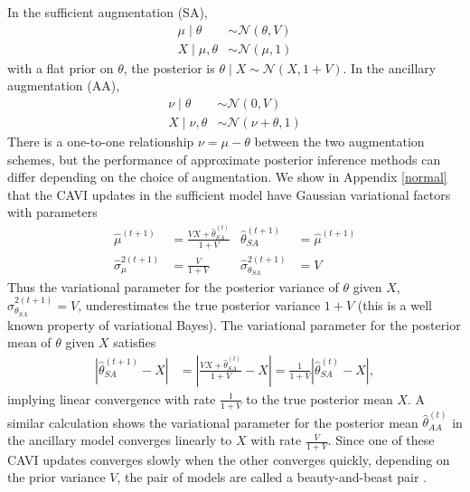 \documentclass{article}
\begin{document}
In the sufficient augmentation (SA),
\begin{align}
\mu \mid \theta
&\sim \mathcal N(\theta,V) \\
X\mid \mu,\theta
&\sim \mathcal N(\mu,1)
\end{align}
with a flat prior on $\theta$, the posterior is $\theta\mid X\sim\mathcal N(X,1+V)$. In the ancillary augmentation (AA),
\begin{align}
\nu \mid \theta
&\sim \mathcal N(0,V) \\
X\mid \nu,\theta
&\sim \mathcal N(\nu +\theta,1)
\end{align}
There is a one-to-one relationship $\nu=\mu-\theta$ between the two augmentation schemes, but the performance of approximate posterior inference methods can differ depending on the choice of augmentation. We show in Appendix \ref{normal} that the CAVI updates in the sufficient model have Gaussian variational factors with parameters 
\begin{align*}
\widehat\mu^{(t+1)}
&= \frac{VX + \widehat\theta^{(t)}_{SA}}{1+V} 
&
\widehat\theta^{(t+1)}_{SA}
&= \widehat\mu^{(t+1)} \\
\widehat\sigma^{2(t+1)}_{\mu}
&= \frac{V}{1+V} 
&
\widehat\sigma^{2(t+1)}_{\theta_{SA}}
&= V
\end{align*}
Thus the variational parameter for the posterior variance of $\theta$ given $X$, $\widehat\sigma^{2(t+1)}_{\theta_{SA}}= V$,  underestimates the true posterior variance $1+V$ (this is a well known property of variational Bayes). The variational parameter for the posterior mean of $\theta$ given $X$ satisfies
\begin{align*}
\left|\widehat\theta^{(t+1)}_{SA} - X\right|
&= \left|\frac{VX + \widehat\theta^{(t)}_{SA}}{1+V} - X\right| 
= \frac{1}{1+V} \left|\widehat\theta^{(t)}_{SA}-X\right|,
\end{align*}
implying linear convergence with rate $\frac{1}{1+V}$ to the true posterior mean $X$. A similar calculation shows the variational parameter for the posterior mean $\widehat\theta^{(t)}_{AA}$ in the ancillary model converges linearly to $X$ with rate $\frac{V}{1+V}$. Since one of these CAVI updates converges slowly when the other converges quickly, depending on the prior variance $V$, the pair of models are called a beauty-and-beast pair \cite{Papaspiliopoulos,van,Yu}. 
\end{document}
